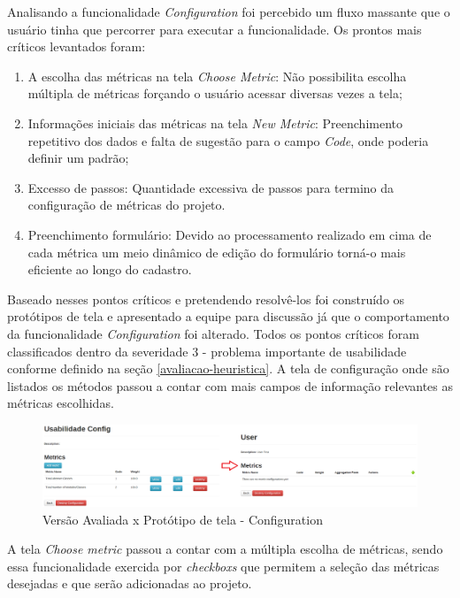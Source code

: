 Analisando a funcionalidade \textit{Configuration} foi percebido um fluxo massante que o usuário tinha que percorrer para executar a funcionalidade. Os prontos mais críticos levantados foram:

\begin{enumerate}
\item A escolha das métricas na tela \textit{Choose Metric}: Não possibilita escolha múltipla de métricas forçando o usuário acessar diversas vezes a tela;
\item Informações iniciais das métricas na tela \textit{New Metric}: Preenchimento repetitivo dos dados e falta de sugestão para o campo \textit{Code}, onde poderia definir um padrão;
\item Excesso de passos: Quantidade excessiva de passos para termino da configuração de métricas do projeto.
\item Preenchimento formulário: Devido ao processamento realizado em cima de cada métrica um meio dinâmico de edição do formulário torná-o mais eficiente ao longo do cadastro.
\end{enumerate}

Baseado nesses pontos críticos e pretendendo resolvê-los foi construído os protótipos de tela e apresentado a equipe para discussão já que o comportamento da funcionalidade \textit{Configuration} foi alterado. Todos os pontos críticos foram classificados dentro da severidade 3 - problema importante de usabilidade conforme definido na seção \ref{avaliacao-heuristica}. A tela de configuração onde são listados os métodos passou a contar com mais campos de informação relevantes as métricas escolhidas.

\graphicspath{{figuras/}}
\begin{figure}[H]
\centering
\includegraphics[width=1.0\textwidth]{PrototipoConfig}
\caption{Versão Avaliada x Protótipo de tela - Configuration}
\label{parallel-coordinate}
\end{figure}

A tela \textit{Choose metric} passou a contar com a múltipla escolha de métricas, sendo essa funcionalidade exercida por \textit{checkboxs} que permitem a seleção das métricas desejadas e que serão adicionadas ao projeto.


